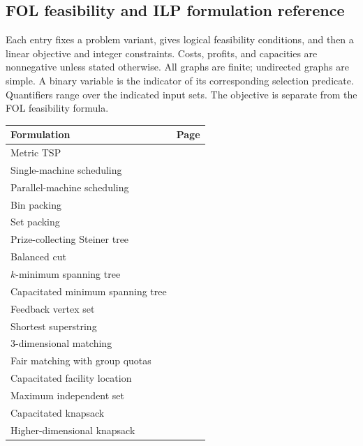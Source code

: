 \subsection{FOL feasibility and ILP formulation reference}\label{lp:catalog}
Each entry fixes a problem variant, gives logical feasibility conditions,
and then a linear objective and integer constraints. Costs, profits, and
capacities are nonnegative unless stated otherwise. All graphs are finite;
undirected graphs are simple. A binary variable is the indicator of its
corresponding selection predicate. Quantifiers range over the indicated
input sets. The objective is separate from the FOL feasibility formula.

\begin{center}
\small\setlength{\tabcolsep}{3pt}
\begin{tabularx}{\linewidth}{@{}Y{1.8}Y{0.2}@{}}
\toprule
\textbf{Formulation} & \textbf{Page}\\\midrule
Metric TSP & \pageref{form:tsp}\\
Single-machine scheduling & \pageref{form:single}\\
Parallel-machine scheduling & \pageref{form:parallel}\\
Bin packing & \pageref{form:bin}\\
Set packing & \pageref{form:setpack}\\
Prize-collecting Steiner tree & \pageref{form:pcst}\\
Balanced cut & \pageref{form:cut}\\
$k$-minimum spanning tree & \pageref{form:kmst}\\
Capacitated minimum spanning tree & \pageref{form:cmst}\\
Feedback vertex set & \pageref{form:fvs}\\
Shortest superstring & \pageref{form:string}\\
3-dimensional matching & \pageref{form:3dm}\\
Fair matching with group quotas & \pageref{form:fair}\\
Capacitated facility location & \pageref{form:facility}\\
Maximum independent set & \pageref{form:independent}\\
Capacitated knapsack & \pageref{form:knapsack}\\
Higher-dimensional knapsack & \pageref{form:multiknapsack}\\
\bottomrule
\end{tabularx}
\end{center}


